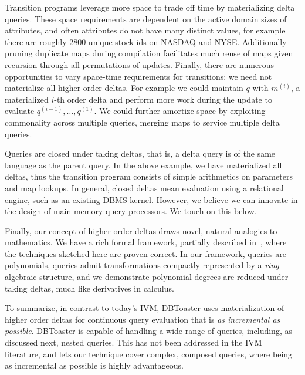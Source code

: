 Transition programs leverage more space to trade off time by materializing delta
queries. These space requirements are dependent on the active domain sizes of
attributes, and often attributes do not have many distinct values, for example
there are roughly 2800 unique stock ids on NASDAQ and NYSE. Additionally pruning
duplicate maps during compilation facilitates much reuse of maps given recursion
through all permutations of updates. Finally, there are numerous opportunities
to vary space-time requirements for transitions: we need not materialize all
higher-order deltas. For example we could maintain $q$ with $m^{(i)}$, a
materialized $i$-th order delta and perform more work during the update to
evaluate $q^{(i-1)}, \ldots, q^{(1)}$. We could further amortize space by
exploiting commonality across multiple queries, merging maps to service multiple
delta queries.



Queries are closed under taking deltas, that is, a delta query is of the same
language as the parent query. In the above example, we have materialized all
deltas, thus the transition program consists of simple arithmetics on parameters
and map lookups. In general, closed deltas mean evaluation using a relational
engine, such as an existing DBMS kernel. However, we believe we can innovate in
the design of main-memory query processors. We touch on this below.

Finally, our concept of higher-order deltas draws novel, natural analogies to
mathematics. We have a rich formal framework, partially described
in~\cite{koch-pods:10}, where the techniques sketched here are proven correct.
In our framework, queries are polynomials, queries admit transformations
compactly represented by a \textit{ring} algebraic structure, and we demonstrate
polynomial degrees are reduced under taking deltas, much like derivatives in
calculus.

To summarize, in contrast to today's IVM, DBToaster uses materialization of
higher order deltas for continuous query evaluation that is \textit{as
incremental as possible}. DBToaster is capable of handling a wide range of
queries, including, as discussed next, nested queries. This has not been
addressed in the IVM literature, and lets our technique cover complex, composed
queries, where being as incremental as possible is highly advantageous.

